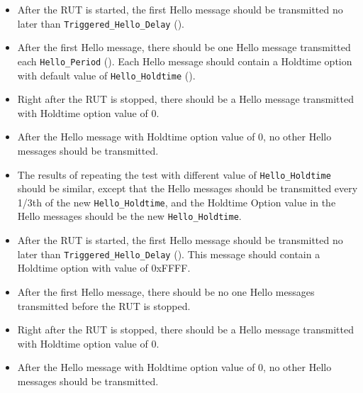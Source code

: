 \documentclass[11pt]{report}
\begin{document}
\begin{itemize}

  \item After the RUT is started, the first Hello message should be
        transmitted no later than \verb=Triggered_Hello_Delay=
        ({\PimsmTriggeredHelloDelay}).

  \item After the first Hello message, there should be one Hello message
        transmitted each \verb=Hello_Period= ({\PimsmHelloPeriod}). Each Hello
        message should contain a Holdtime option with default value of
        \verb=Hello_Holdtime= ({\PimsmHelloHoldtime}).

  \item Right after the RUT is stopped, there should be
        a Hello message transmitted with Holdtime option value of 0.

  \item After the Hello message with Holdtime option value of 0,
        no other Hello messages should be transmitted.

  \item The results of repeating the test with different value of
        \verb=Hello_Holdtime= should be similar, except that the
        Hello messages should be transmitted every 1/3th of
        the new \verb=Hello_Holdtime=, and the Holdtime Option value
        in the Hello messages should be the new \verb=Hello_Holdtime=.

\end{itemize}


\begin{itemize}

  \item After the RUT is started, the first Hello message should be
        transmitted no later than \verb=Triggered_Hello_Delay=
        ({\PimsmTriggeredHelloDelay}). This message should contain
        a Holdtime option with value of 0xFFFF.

  \item After the first Hello message, there should be no one Hello messages
        transmitted before the RUT is stopped.

  \item Right after the RUT is stopped, there should be
        a Hello message transmitted with Holdtime option value of 0.

  \item After the Hello message with Holdtime option value of 0,
        no other Hello messages should be transmitted.

\end{itemize}
\end{document}
